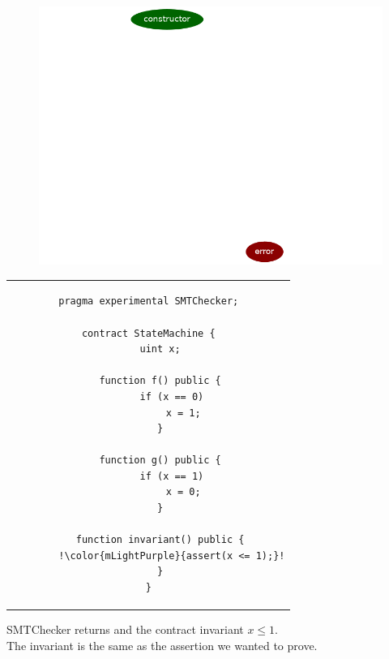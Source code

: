 \documentclass[aspectratio=169,10pt]{beamer}
\begin{document}
\begin{frame}[fragile]
\begin{figure}
	\includegraphics[scale=0.3]{images/state_machine_reachability}
\end{figure}
\end{frame}

\begin{frame}[fragile]
\begin{center}
\begin{tabular}{c}
\begin{lstlisting}[basicstyle=\tiny,escapechar=!]
pragma experimental SMTChecker;

contract StateMachine {
    uint x;

    function f() public {
        if (x == 0)
            x = 1;
    }

    function g() public {
        if (x == 1)
            x = 0;
    }

    function invariant() public {
        !\color{mLightPurple}{assert(x <= 1);}!
    }
}
\end{lstlisting}
\end{tabular}
\end{center}
SMTChecker returns {\color{mLightPurple}{safe}} and the contract invariant $x \le 1$.\\
The invariant is the same as the assertion we wanted to prove.
\end{frame}
\end{document}
